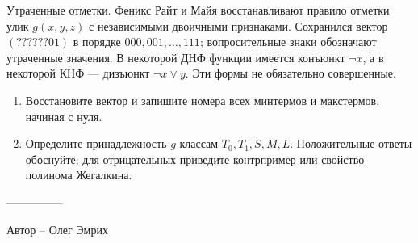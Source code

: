 \question
Утраченные отметки. Феникс Райт и Майя восстанавливают правило отметки улик $g(x,y,z)$ с независимыми двоичными признаками. Сохранился вектор $(??????01)$ в порядке $000,001,\ldots,111$; вопросительные знаки обозначают утраченные значения. В некоторой ДНФ функции имеется конъюнкт $\neg x$, а в некоторой КНФ --- дизъюнкт $\neg x\lor y$. Эти формы не обязательно совершенные.
\begin{enumerate}
\item Восстановите вектор и запишите номера всех минтермов и макстермов, начиная с нуля.
\item Определите принадлежность $g$ классам $T_0,T_1,S,M,L$. Положительные ответы обоснуйте; для отрицательных приведите контрпример или свойство полинома Жегалкина.
\end{enumerate}

---------------

Автор -- Олег Эмрих

